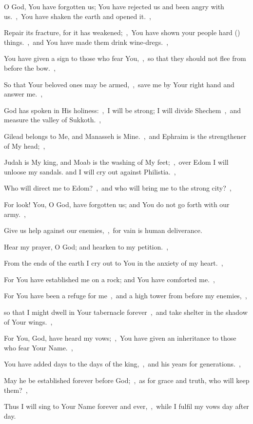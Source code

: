 \documentclass[12pt,twoside,a5paper]{article}
\begin{document}

\begin{normalparskip}
  O God, You have forgotten us; You have rejected us and been angry with us.~\sep\ You have shaken the earth and opened it.~\sep


  Repair its fracture, for it has weakened;~\sep\ You have shown your people hard () things.~\sep\ and You have made them drink wine-dregs.~\sep

  You have given a sign to those who fear You,~\sep\ so that they should not flee from before the bow.~\sep

  So that Your beloved ones may be armed,~\sep\ save me by Your right hand and answer me.~\sep

  God has spoken in His holiness:~\sep\ I will be strong; I will divide Shechem~\sep\ and measure the valley of Sukkoth.~\sep

  Gilead belongs to Me, and Manasseh is Mine.~\sep\ and Ephraim is the strengthener of My head;~\sep

  Judah is My king, and Moab is the washing of My feet;~\sep\ over Edom I will unloose my sandals. and I will cry out against Philistia.~\sep

  Who will direct me to Edom?~\sep\ and who will bring me to the strong city?~\sep

  For look! You, O God, have forgotten us; and You do not go forth with our army.~\sep

  Give us help against our enemies,~\sep\ for vain is human deliverance.
\end{normalparskip}


\begin{normalparskip}
  Hear my prayer, O God; and hearken to my petition.~\sep

  From the ends of the earth I cry out to You in the anxiety of my heart.~\sep


  For You have established me on a rock; and You have comforted me.~\sep

  For You have been a refuge for me~\sep\ and a high tower from before my enemies,~\sep

  so that I might dwell in Your tabernacle forever~\sep\ and take shelter in the shadow of Your wings.~\sep

  For You, God, have heard my vows;~\sep\ You have given an inheritance to those who fear Your Name.~\sep

  You have added days to the days of the king,~\sep\ and his years for generations.~\sep

  May he be established forever before God;~\sep\ as for grace and truth, who will keep them?~\sep

  Thus I will sing to Your Name forever and ever,~\sep\ while I fulfil my vows day after day.
\end{normalparskip}
\end{document}
